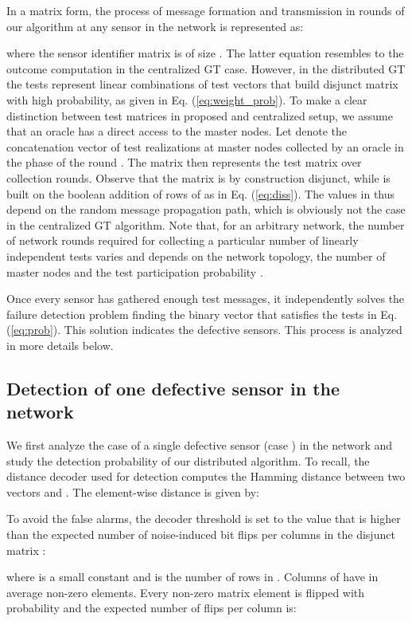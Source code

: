 \documentclass[journal]{IEEEtran}
\begin{document}
In a matrix form, the process of message formation and transmission in  rounds of our algorithm at any sensor in the network is represented as:

where the sensor identifier matrix  is of size . 
The latter equation resembles to the outcome computation in the centralized GT case. However, in the distributed GT the tests represent linear combinations of test vectors that build disjunct matrix with high probability, as given in Eq. (\ref{eq:weight_prob}). To make a clear distinction between test matrices in proposed and centralized setup, we assume that an oracle has a direct access to the master nodes. Let  denote the concatenation vector of test realizations at master nodes collected by an oracle in the phase  of the round . The matrix  then represents the test matrix over  collection rounds. Observe that the matrix  is by construction disjunct, while  is built on the boolean addition of rows of  as in Eq. (\ref{eq:diss}). The values in  thus depend on the random message propagation path, which is obviously not the case in the centralized GT algorithm. Note that, for an arbitrary network, the number of network rounds required for collecting a particular number of linearly independent tests varies and depends on the network topology, the number of master nodes  and the test participation probability . 

Once every sensor has gathered enough test messages, it independently solves the failure detection problem finding the binary vector  that satisfies the tests in Eq. (\ref{eq:prob}). This solution  indicates the defective sensors. This process is analyzed in more details below.

\subsection{Detection of one defective sensor in the network}\label{sec:caseI_sol}
We first analyze the case of a single defective sensor (case ) in the network and study the detection probability of our distributed algorithm. To recall, the distance decoder used for detection computes the Hamming distance between two vectors  and . The element-wise distance is given by:

To avoid the false alarms, the decoder threshold  is set to the value that is higher than the expected number of noise-induced bit flips per columns in the disjunct matrix   \cite{Cheraghchi:11}:

where  is a small constant and  is the number of rows in . Columns of  have in average  non-zero elements. Every non-zero matrix element is flipped with probability  and the expected number of flips per column is:
\end{document}

